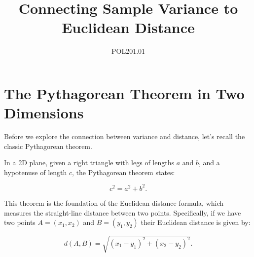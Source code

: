 \documentclass{article}
\begin{document}
\title{Connecting Sample Variance to Euclidean Distance}
\author{POL201.01}
\date{}
\maketitle

\section{The Pythagorean Theorem in Two Dimensions}

Before we explore the connection between variance and distance, let’s recall the classic Pythagorean theorem. 

In a 2D plane, given a right triangle with legs of lengths \(a\) and \(b\), and a hypotenuse of length \(c\), the Pythagorean theorem states:

\begin{equation}
    c^2 = a^2 + b^2.
\end{equation}

This theorem is the foundation of the Euclidean distance formula, which measures the straight-line distance between two points. Specifically, if we have two points \(A = (x_1, x_2)\) and \(B = (y_1, y_2)\) their Euclidean distance is given by:

\begin{equation}
    d(A, B) = \sqrt{(x_1 - y_1)^2 + (x_2 - y_2)^2 }.
\end{equation}

\begin{center}
\end{center}
\end{document}

